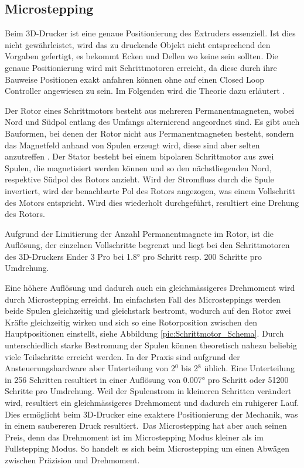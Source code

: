 \subsection{Microstepping}
\label{sec:Microstepping}

Beim 3D-Drucker ist eine genaue Positionierung des Extruders essenziell. Ist dies nicht gewährleistet, wird das zu druckende Objekt nicht entsprechend den Vorgaben gefertigt, es bekommt Ecken und Dellen wo keine sein sollten. Die genaue Positionierung wird mit Schrittmotoren erreicht, da diese durch ihre Bauweise Positionen exakt anfahren können ohne auf einen Closed Loop Controller angewiesen zu sein. Im Folgenden wird die Theorie dazu erläutert \cite{SchrittmotorDeltron}.\

Der Rotor eines Schrittmotors besteht aus mehreren Permanentmagneten, wobei Nord und Südpol entlang des Umfangs alternierend angeordnet sind. Es gibt auch Bauformen, bei denen der Rotor nicht aus Permanentmagneten besteht, sondern das Magnetfeld anhand von Spulen erzeugt wird, diese sind aber selten anzutreffen \cite{ElektrischeAntriebe}. Der Stator besteht bei einem bipolaren Schrittmotor aus zwei Spulen, die magnetisiert werden können und so den nächstliegenden Nord, respektive Südpol des Rotors anzieht. Wird der Stromfluss durch die Spule invertiert, wird der benachbarte Pol des Rotors angezogen, was einem Vollschritt des Motors entspricht.  Wird dies wiederholt durchgeführt, resultiert eine Drehung des Rotors.\

Aufgrund der Limitierung der Anzahl Permanentmagnete im Rotor, ist die Auflösung, der einzelnen Vollschritte begrenzt und liegt bei den Schrittmotoren des 3D-Druckers Ender 3 Pro bei 1.8° pro Schritt resp. 200 Schritte pro Umdrehung.\

Eine höhere Auflösung und dadurch auch ein gleichmässigeres Drehmoment wird durch Microstepping erreicht. Im einfachsten Fall des Microsteppings werden beide Spulen gleichzeitig und gleichstark bestromt,  wodurch auf den Rotor zwei Kräfte gleichzeitig wirken und sich so eine Rotorposition zwischen den Hauptpositionen einstellt, siehe Abbildung \ref{pic:Schrittmotor_Schema}. Durch unterschiedlich starke Bestromung der Spulen können theoretisch nahezu beliebig viele Teilschritte erreicht werden. In der Praxis sind aufgrund der Ansteuerungshardware aber Unterteilung von  2$^0$ bis 2$^8$  üblich. Eine Unterteilung in 256 Schritten resultiert in einer Auflösung von 0.007° pro Schritt oder 51200 Schritte pro Umdrehung.
Weil der Spulenstrom in kleineren Schritten verändert wird, resultiert ein gleichmässigeres Drehmoment und dadurch ein ruhigerer Lauf. Dies ermöglicht beim 3D-Drucker eine exaktere Positionierung der Mechanik, was in einem saubereren Druck resultiert.\
Das Microstepping hat aber auch seinen Preis, denn das Drehmoment ist im Microstepping Modus kleiner als im Fullstepping Modus. So handelt es sich beim Microstepping um einen Abwägen zwischen Präzision und Drehmoment.\

